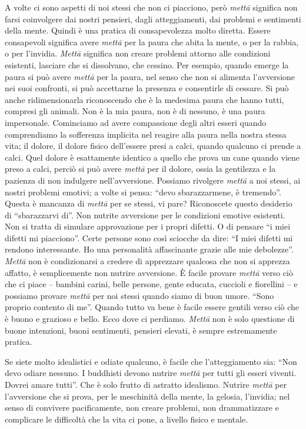 A volte ci sono aspetti di noi stessi che non ci piacciono, però \textit{mettā}
significa non farsi coinvolgere dai nostri pensieri, dagli
atteggiamenti, dai problemi e sentimenti della mente. Quindi è una
pratica di consapevolezza molto diretta. Essere consapevoli significa
avere \textit{mettā} per la paura che abita la mente, o per la rabbia, o per
l'invidia. \textit{Mettā} significa non creare problemi attorno alle condizioni
esistenti, lasciare che si dissolvano, che cessino. Per esempio, quando
emerge la paura si può avere \textit{mettā} per la paura, nel senso che non si
alimenta l'avversione nei suoi confronti, si può accettarne la presenza
e consentirle di cessare. Si può anche ridimensionarla riconoscendo che
è la medesima paura che hanno tutti, compresi gli animali. Non è la mia
paura, non è di nessuno, è una paura impersonale. Cominciamo ad avere
compassione degli altri esseri quando comprendiamo la sofferenza
implicita nel reagire alla paura nella nostra stessa vita; il dolore, il
dolore fisico dell'essere presi a calci, quando qualcuno ci prende a
calci. Quel dolore è esattamente identico a quello che prova un cane
quando viene preso a calci, perciò si può avere \textit{mettā} per il dolore,
ossia la gentilezza e la pazienza di non indulgere nell'avversione.
Possiamo rivolgere \textit{mettā} a noi stessi, ai nostri problemi emotivi; a
volte si pensa: ``devo sbarazzarmene, è tremendo''. Questa è mancanza di
\textit{mettā} per se stessi, vi pare? Riconoscete questo desiderio di
``sbarazzarvi di''. Non nutrite avversione per le condizioni emotive
esistenti. Non si tratta di simulare approvazione per i propri difetti.
O di pensare ``i miei difetti mi piacciono''. Certe persone sono così
sciocche da dire: ``I miei difetti mi rendono interessante. Ho una
personalità affascinante grazie alle mie debolezze''. \textit{Mettā} non è
condizionarsi a credere di apprezzare qualcosa che non si apprezza
affatto, è semplicemente non nutrire avversione. È facile provare \textit{mettā}
verso ciò che ci piace – bambini carini, belle persone, gente educata,
cuccioli e fiorellini – e possiamo provare \textit{mettā} per noi stessi quando
siamo di buon umore. ``Sono proprio contento di me''. Quando tutto va bene
è facile essere gentili verso ciò che è buono e grazioso e bello. Ecco
dove ci perdiamo. \textit{Mettā} non è solo questione di buone intenzioni, buoni
sentimenti, pensieri elevati, è sempre estremamente pratica.

Se siete molto idealistici e odiate qualcuno, è facile che
l'atteggiamento sia: ``Non devo odiare nessuno. I buddhisti devono
nutrire \textit{mettā} per tutti gli esseri viventi. Dovrei amare tutti''. Che è
solo frutto di astratto idealismo. Nutrire \textit{mettā} per l'avversione che si
prova, per le meschinità della mente, la gelosia, l'invidia; nel senso
di convivere pacificamente, non creare problemi, non drammatizzare e
complicare le difficoltà che la vita ci pone, a livello fisico e
mentale.

